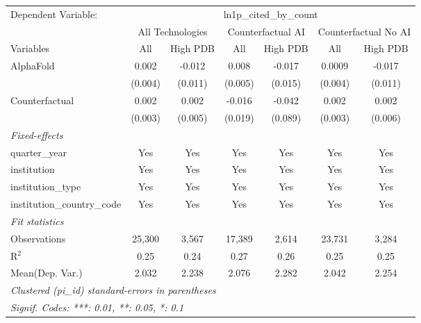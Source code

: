 \begingroup
\centering
\begin{tabular}{lcccccc}
   \tabularnewline \midrule \midrule
   Dependent Variable: & \multicolumn{6}{c}{ln1p\_cited\_by\_count}\\
 & \multicolumn{2}{c}{All Technologies} & \multicolumn{2}{c}{Counterfactual AI} & \multicolumn{2}{c}{Counterfactual No AI} \\
\cmidrule(lr){1-1}\cmidrule(lr){2-3} \cmidrule(lr){4-5} \cmidrule(lr){6-7}
Variables & \multicolumn{1}{c}{All} & \multicolumn{1}{c}{High PDB} & \multicolumn{1}{c}{All} & \multicolumn{1}{c}{High PDB} & \multicolumn{1}{c}{All} & \multicolumn{1}{c}{High PDB} \\
\cmidrule(lr){1-1}\cmidrule(lr){2-2} \cmidrule(lr){3-3} \cmidrule(lr){4-4} \cmidrule(lr){5-5} \cmidrule(lr){6-6} \cmidrule(lr){7-7}
   AlphaFold                    & 0.002   & -0.012  & 0.008   & -0.017  & 0.0009  & -0.017\\   
                                & (0.004) & (0.011) & (0.005) & (0.015) & (0.004) & (0.011)\\   
   Counterfactual               & 0.002   & 0.002   & -0.016  & -0.042  & 0.002   & 0.002\\   
                                & (0.003) & (0.005) & (0.019) & (0.089) & (0.003) & (0.006)\\   
   \midrule
   \emph{Fixed-effects}\\
   quarter\_year                & Yes     & Yes     & Yes     & Yes     & Yes     & Yes\\  
   institution                  & Yes     & Yes     & Yes     & Yes     & Yes     & Yes\\  
   institution\_type            & Yes     & Yes     & Yes     & Yes     & Yes     & Yes\\  
   institution\_country\_code   & Yes     & Yes     & Yes     & Yes     & Yes     & Yes\\  
   \midrule
   \emph{Fit statistics}\\
   Observations                 & 25,300  & 3,567   & 17,389  & 2,614   & 23,731  & 3,284\\  
   R$^2$                        & 0.25    & 0.24    & 0.27    & 0.26    & 0.25    & 0.25\\  
Mean(Dep. Var.) & 2.032 & 2.238 & 2.076 & 2.282 & 2.042 & 2.254 \\
   \midrule \midrule
   \multicolumn{7}{l}{\emph{Clustered (pi\_id) standard-errors in parentheses}}\\
   \multicolumn{7}{l}{\emph{Signif. Codes: ***: 0.01, **: 0.05, *: 0.1}}\\
\end{tabular}
\par\endgroup
